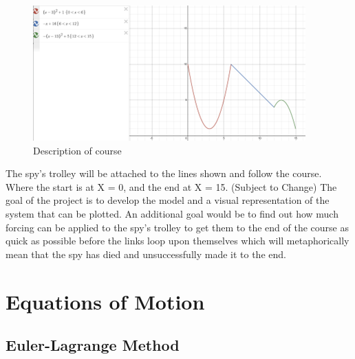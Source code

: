 \documentclass{article}
\begin{document}
\begin{figure}[h]
	\centering
	\includegraphics[scale=0.5]{course_description}	
	\caption{Description of course}
\end{figure}

The spy’s trolley will be attached to the lines shown and follow the course. Where the start is at X = 0, and the end at X = 15. (Subject to Change)
The goal of the project is to develop the model and a visual representation of the system that can be plotted. An additional goal would be to find out how much forcing can be applied to the spy’s trolley to 
get them to the end of the course as quick as possible before the links loop upon themselves which will metaphorically mean that the spy has died and unsuccessfully made it to the end. 

\section{Equations of Motion}
\subsection{Euler-Lagrange Method}
\end{document}
